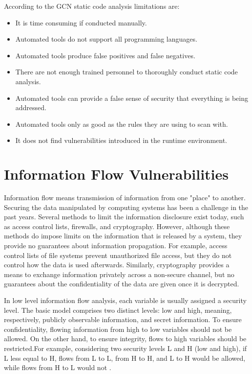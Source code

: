 According to the GCN \cite{ref_87_gcn:gcn} static code analysis limitations are:
\begin{itemize}
	\item It is time consuming if conducted manually.
	\item Automated tools do not support all programming languages.
	\item Automated tools produce false positives and false negatives.
	\item There are not enough trained personnel to thoroughly conduct static code analysis.
	\item Automated tools can provide a false sense of security that everything is being addressed.
	\item Automated tools only as good as the rules they are using to scan with.
	\item It does not find vulnerabilities introduced in the runtime environment.
\end{itemize}

\section{Information Flow Vulnerabilities}

Information flow means  transmission of information from one "place" to another. Securing the data manipulated by computing systems has been a challenge in the past years. Several methods to limit the information disclosure exist today, such as access control lists, firewalls, and cryptography. However, although these methods do impose limits on the information that is released by a system, they provide no guarantees about information propagation. For example, access control lists of file systems prevent unauthorized file access, but they do not control how the data is used afterwards. Similarly, cryptography provides a means to exchange information privately across a non-secure channel, but no guarantees about the confidentiality of the data are given once it is decrypted.

In low level information flow analysis, each variable is usually assigned a security level. The basic model comprises two distinct levels: low and high, meaning, respectively, publicly observable information, and secret information. To ensure confidentiality, flowing information from high to low variables should not be allowed. On the other hand, to ensure integrity, flows to high variables should be restricted.For example, considering two security levels L and H (low and high), if L less equal to H, flows from L to L, from H to H, and L to H would be allowed, while flows from H to L would not \cite{ref_88_smith2007principles}.

